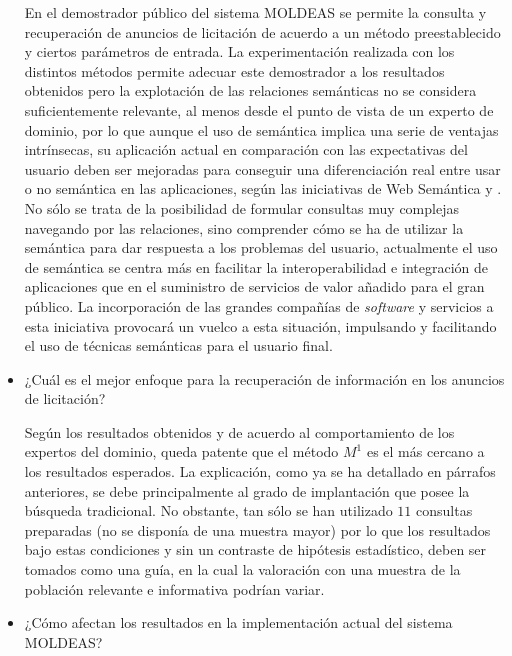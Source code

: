 \begin{itemize}
En el demostrador público del sistema \gls{MOLDEAS} se permite la consulta y recuperación de anuncios de licitación de acuerdo 
a un método preestablecido y ciertos parámetros de entrada. La experimentación realizada con los distintos métodos permite 
adecuar este demostrador a los resultados obtenidos pero la explotación de las relaciones semánticas no se considera 
suficientemente relevante, al menos desde el punto de vista de un experto de dominio, por lo que aunque el uso de 
semántica implica una serie de ventajas intrínsecas, su aplicación actual en comparación con las expectativas 
del usuario deben ser mejoradas para conseguir una diferenciación real entre usar o no semántica en las 
aplicaciones, según las iniciativas de Web Semántica y \linkeddata. No sólo se trata de la posibilidad 
de formular consultas muy complejas navegando por las relaciones, sino comprender cómo se ha de utilizar la semántica para dar respuesta 
a los problemas del usuario, actualmente el uso de semántica se centra más en facilitar la interoperabilidad e integración de aplicaciones que 
en el suministro de servicios de valor añadido para el gran público. La incorporación de las grandes compañías de \textit{software} y servicios a 
esta iniciativa provocará un vuelco a esta situación, impulsando y facilitando el uso de técnicas semánticas para el usuario 
final.


 \item ¿Cuál es el mejor enfoque para la recuperación de información en los anuncios de licitación? 

Según los resultados obtenidos y de acuerdo al comportamiento de los expertos del dominio, queda patente que el 
método $M^1$ es el más cercano a los resultados esperados. La explicación, como ya se ha detallado en párrafos anteriores, 
se debe principalmente al grado de implantación que posee la búsqueda tradicional. No obstante, tan sólo se han utilizado 
$11$ consultas preparadas (no se disponía de una muestra mayor) por lo que los resultados bajo estas condiciones y 
sin un contraste de hipótesis estadístico, deben ser tomados como una guía, en la cual la valoración con una muestra 
de la población relevante e informativa podrían variar.

 \item ¿Cómo afectan los resultados en la implementación actual del sistema MOLDEAS?


\end{itemize}

